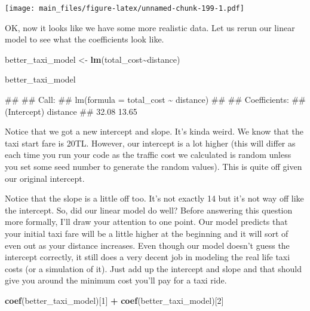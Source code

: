 \documentclass[
]{book}
\newenvironment{Shaded}{\begin{snugshade}}{\end{snugshade}}
\newcommand{\DecValTok}[1]{\textcolor[rgb]{0.00,0.00,0.81}{#1}}
\newcommand{\FunctionTok}[1]{\textcolor[rgb]{0.13,0.29,0.53}{\textbf{#1}}}
\newcommand{\NormalTok}[1]{#1}
\newcommand{\OtherTok}[1]{\textcolor[rgb]{0.56,0.35,0.01}{#1}}
\newcommand{\SpecialCharTok}[1]{\textcolor[rgb]{0.81,0.36,0.00}{\textbf{#1}}}
\begin{document}
\texttt{[image: main\_files/figure-latex/unnamed-chunk-199-1.pdf]}

OK, now it looks like we have some more realistic data. Let us rerun our linear model to see what the coefficients look like.

\begin{Shaded}
\begin{Highlighting}[]
\NormalTok{better\_taxi\_model }\OtherTok{\textless{}{-}} \FunctionTok{lm}\NormalTok{(total\_cost}\SpecialCharTok{\textasciitilde{}}\NormalTok{distance)}

\NormalTok{better\_taxi\_model}
\end{Highlighting}
\end{Shaded}

\begin{Shaded}
\begin{Highlighting}[]
\NormalTok{\#\# }
\NormalTok{\#\# Call:}
\NormalTok{\#\# lm(formula = total\_cost \textasciitilde{} distance)}
\NormalTok{\#\# }
\NormalTok{\#\# Coefficients:}
\NormalTok{\#\# (Intercept)     distance  }
\NormalTok{\#\#       32.08        13.65}
\end{Highlighting}
\end{Shaded}

Notice that we got a new intercept and slope. It's kinda weird. We know that the taxi start fare is 20TL. However, our intercept is a lot higher (this will differ as each time you run your code as the traffic cost we calculated is random unless you set some seed number to generate the random values). This is quite off given our original intercept.

Notice that the slope is a little off too. It's not exactly 14 but it's not way off like the intercept. So, did our linear model do well? Before answering this question more formally, I'll draw your attention to one point. Our model predicts that your initial taxi fare will be a little higher at the beginning and it will sort of even out as your distance increases. Even though our model doesn't guess the intercept correctly, it still does a very decent job in modeling the real life taxi costs (or a simulation of it). Just add up the intercept and slope and that should give you around the minimum cost you'll pay for a taxi ride.

\begin{Shaded}
\begin{Highlighting}[]
\FunctionTok{coef}\NormalTok{(better\_taxi\_model)[}\DecValTok{1}\NormalTok{] }\SpecialCharTok{+} \FunctionTok{coef}\NormalTok{(better\_taxi\_model)[}\DecValTok{2}\NormalTok{]}
\end{Highlighting}
\end{Shaded}
\end{document}
